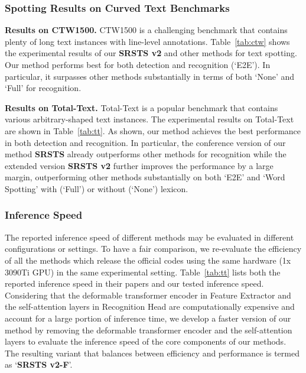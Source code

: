 \subsubsection{Spotting Results on Curved Text Benchmarks}


\smallskip\noindent\textbf{Results on CTW1500.}
CTW1500 is a challenging benchmark that contains plenty of long text instances with line-level annotations. Table~\ref{tab:ctw} shows the experimental results of our \textbf{SRSTS v2} and other methods for text spotting. Our method performs best for both detection and recognition (`E2E'). In particular, it surpasses other methods substantially in terms of both `None' and `Full' for recognition. 

\smallskip\noindent\textbf{Results on Total-Text.}
Total-Text is a popular benchmark that contains various arbitrary-shaped text instances. The experimental results on Total-Text are shown in Table~\ref{tab:tt}. As shown, our method achieves the best performance in both detection and recognition. In particular, the conference version of our method \textbf{SRSTS} already outperforms other methods for recognition while the extended version \textbf{SRSTS v2} further improves the performance by a large margin, outperforming other methods substantially on both `E2E' and `Word Spotting' with (`Full') or without (`None') lexicon. 


\begin{comment}
\subsubsection{Qualitative Results}
\wu{We visualize the detection results, sampled points, and predicted text transcriptions in Figure~\ref{fig:vis}. As shown, \textbf{SRSTS v2} performs well when facing challenging text instances which are varied in size, orientation, and length. }
\end{comment}

\subsubsection{Inference Speed}
The reported inference speed of different methods may be evaluated in different configurations or settings. To have a fair comparison, we re-evaluate the efficiency of all the methods which release the official codes using the same hardware (1x 3090Ti GPU) in the same experimental setting. Table~\ref{tab:tt} lists both the reported inference speed in their papers and our tested inference speed. Considering that the deformable transformer encoder in Feature Extractor and the self-attention layers in Recognition Head are computationally expensive and account for a large portion of inference time, we develop a faster version of our method by removing the deformable transformer encoder and the self-attention layers to evaluate the inference speed of the core components of our methods. The resulting variant that balances between efficiency and performance is termed as `\textbf{SRSTS v2-F}'. 

